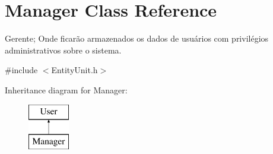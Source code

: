 \hypertarget{classManager}{\section{Manager Class Reference}
\label{dd/dcd/classManager}
}


Gerente; Onde ficarão armazenados os dados de usuários com privilégios administrativos sobre o sistema.  




{\ttfamily \#include $<$Entity\-Unit.\-h$>$}

Inheritance diagram for Manager\-:\begin{figure}[H]
\begin{center}
\leavevmode
\includegraphics[height=2.000000cm]{dd/dcd/classManager}
\end{center}
\end{figure}
